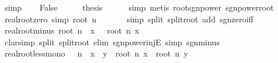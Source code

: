 \begin{isabellebody}
\ simp\isanewline
{}\isamarkupfalse%
\isanewline
\ \ \isamarkupfalse%
\ False\isanewline
\ \ \isamarkupfalse%
\ \isamarkupfalse%
\ {\isacharquery}{\kern0pt}thesis\isanewline
\ \ \ \ \isamarkupfalse%
\ simp\ {\isacharparenleft}{\kern0pt}metis\ root{\isacharunderscore}{\kern0pt}sgn{\isacharunderscore}{\kern0pt}power\ sgn{\isacharunderscore}{\kern0pt}power{\isacharunderscore}{\kern0pt}root{\isacharparenright}{\kern0pt}\isanewline
{}\isamarkupfalse%
%
\endisatagproof
{\isafoldproof}%
%
\isadelimproof
\isanewline
%
\endisadelimproof
\isanewline
{}\isamarkupfalse%
\ real{\isacharunderscore}{\kern0pt}root{\isacharunderscore}{\kern0pt}zero\ {\isacharbrackleft}{\kern0pt}simp{\isacharbrackright}{\kern0pt}{\isacharcolon}{\kern0pt}\ {\isachardoublequoteopen}root\ n\ {}\ {\isacharequal}{\kern0pt}\ {}{\isachardoublequoteclose}\isanewline
%
\isadelimproof
\ \ %
\endisadelimproof
%
\isatagproof
{}\isamarkupfalse%
\ {\isacharparenleft}{\kern0pt}simp\ split{\isacharcolon}{\kern0pt}\ split{\isacharunderscore}{\kern0pt}root\ add{\isacharcolon}{\kern0pt}\ sgn{\isacharunderscore}{\kern0pt}zero{\isacharunderscore}{\kern0pt}iff{\isacharparenright}{\kern0pt}%
\endisatagproof
{\isafoldproof}%
%
\isadelimproof
\isanewline
%
\endisadelimproof
\isanewline
{}\isamarkupfalse%
\ real{\isacharunderscore}{\kern0pt}root{\isacharunderscore}{\kern0pt}minus{\isacharcolon}{\kern0pt}\ {\isachardoublequoteopen}root\ n\ {\isacharparenleft}{\kern0pt}{\isacharminus}{\kern0pt}\ x{\isacharparenright}{\kern0pt}\ {\isacharequal}{\kern0pt}\ {\isacharminus}{\kern0pt}\ root\ n\ x{\isachardoublequoteclose}\isanewline
%
\isadelimproof
\ \ %
\endisadelimproof
%
\isatagproof
{}\isamarkupfalse%
\ {\isacharparenleft}{\kern0pt}clarsimp\ split{\isacharcolon}{\kern0pt}\ split{\isacharunderscore}{\kern0pt}root\ elim{\isacharbang}{\kern0pt}{\isacharcolon}{\kern0pt}\ sgn{\isacharunderscore}{\kern0pt}power{\isacharunderscore}{\kern0pt}injE\ simp{\isacharcolon}{\kern0pt}\ sgn{\isacharunderscore}{\kern0pt}minus{\isacharparenright}{\kern0pt}%
\endisatagproof
{\isafoldproof}%
%
\isadelimproof
\isanewline
%
\endisadelimproof
\isanewline
{}\isamarkupfalse%
\ real{\isacharunderscore}{\kern0pt}root{\isacharunderscore}{\kern0pt}less{\isacharunderscore}{\kern0pt}mono{\isacharcolon}{\kern0pt}\ {\isachardoublequoteopen}{}\ {\isacharless}{\kern0pt}\ n\ {\isasymLongrightarrow}\ x\ {\isacharless}{\kern0pt}\ y\ {\isasymLongrightarrow}\ root\ n\ x\ {\isacharless}{\kern0pt}\ root\ n\ y{\isachardoublequoteclose}\isanewline

\end{isabellebody}
